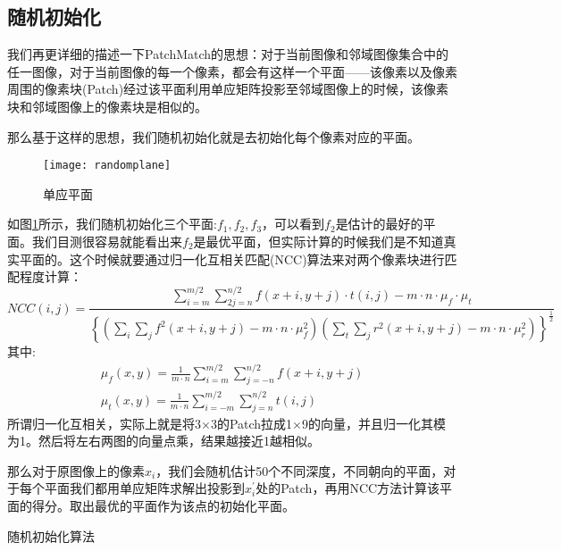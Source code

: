 \subsection{随机初始化}
我们再更详细的描述一下PatchMatch的思想：对于当前图像和邻域图像集合中的任一图像，对于当前图像的每一个像素，都会有这样一个平面——该像素以及像素周围的像素块(Patch)经过该平面利用单应矩阵投影至邻域图像上的时候，该像素块和邻域图像上的像素块是相似的。\par
那么基于这样的思想，我们随机初始化就是去初始化每个像素对应的平面。\par
\begin{figure}[H]
		\centering
		\texttt{[image: randomplane]}
		\caption{单应平面}
		\label{randomplane}
\end{figure}
如图\ref{randomplane}所示，我们随机初始化三个平面:$f_1,f_2,f_3$，可以看到$f_2$是估计的最好的平面。我们目测很容易就能看出来$f_2$是最优平面，但实际计算的时候我们是不知道真实平面的。这个时候就要通过归一化互相关匹配(NCC)算法来对两个像素块进行匹配程度计算：
\begin{equation}
	NCC(i,j)=\frac{\sum_{i=m}^{m / 2} \sum_{2 j=n}^{n / 2} f(x+i, y+j) \cdot t(i, j)-m \cdot n \cdot \mu_{f} \cdot \mu_{t}}{\left\{\left(\sum_{i} \sum_{j} f^{2}(x+i, y+j)-m \cdot n \cdot \mu_{f}^{2}\right)\left(\sum_{t} \sum_{j} r^{2}(x+i, y+j)-m \cdot n \cdot \mu_{r}^{2}\right)\right\}^{\frac{1}{2}}}
\end{equation}
其中:
\begin{equation}
\begin{array}{l}{\mu_{f}(x, y)=\frac{1}{m \cdot n} \sum_{i=m}^{m / 2} \sum_{j=-n}^{n / 2} f(x+i, y+j)} \\ {\mu_{t}(x, y)=\frac{1}{m \cdot n} \sum_{i=-m}^{m / 2} \sum_{j=n}^{n / 2} t(i, j)}\end{array}
\end{equation}
所谓归一化互相关，实际上就是将3$\times$3的Patch拉成1$\times$9的向量，并且归一化其模为1。然后将左右两图的向量点乘，结果越接近1越相似。\par
那么对于原图像上的像素$x_i$，我们会随机估计50个不同深度，不同朝向的平面，对于每个平面我们都用单应矩阵求解出投影到$x^{\prime}_i$处的Patch，再用NCC方法计算该平面的得分。取出最优的平面作为该点的初始化平面。
\begin{algorithm}[H]
	\caption{随机初始化算法}
	\label{algo:rabdom}
\end{algorithm}

